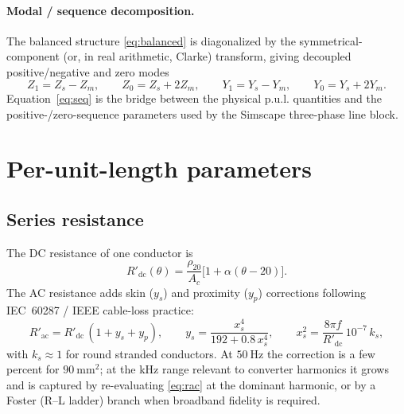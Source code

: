 \documentclass[11pt,a4paper]{article}
\begin{document}
\paragraph{Modal / sequence decomposition.}
The balanced structure \eqref{eq:balanced} is diagonalized by the symmetrical-component
(or, in real arithmetic, Clarke) transform, giving decoupled positive/negative
and zero modes
\begin{equation}
Z_1=Z_s-Z_m,\qquad Z_0=Z_s+2Z_m,
\qquad
Y_1=Y_s-Y_m,\qquad Y_0=Y_s+2Y_m .
\label{eq:seq}
\end{equation}
Equation~\eqref{eq:seq} is the bridge between the physical p.u.l. quantities and
the positive-/zero-sequence parameters used by the Simscape three-phase line
block.

\section{Per-unit-length parameters}\label{sec:pul}

\subsection{Series resistance}
The DC resistance of one conductor is
\begin{equation}
R'_{\mathrm{dc}}(\theta)=\frac{\rho_{20}}{A_c}\bigl[1+\alpha(\theta-20)\bigr].
\label{eq:rdc}
\end{equation}
The AC resistance adds skin ($y_s$) and proximity ($y_p$) corrections following
IEC~60287 / IEEE cable-loss practice:
\begin{equation}
R'_{\mathrm{ac}}=R'_{\mathrm{dc}}\,(1+y_s+y_p),
\qquad
y_s=\frac{x_s^4}{192+0.8\,x_s^4},
\qquad
x_s^2=\frac{8\pi f}{R'_{\mathrm{dc}}}\,10^{-7}\,k_s,
\label{eq:rac}
\end{equation}
with $k_s\approx1$ for round stranded conductors. At $50\ \mathrm{Hz}$ the
correction is a few percent for $90\ \mathrm{mm^2}$; at the kHz range relevant to
converter harmonics it grows and is captured by re-evaluating \eqref{eq:rac} at the
dominant harmonic, or by a Foster (R--L ladder) branch when broadband fidelity is
required.
\end{document}
